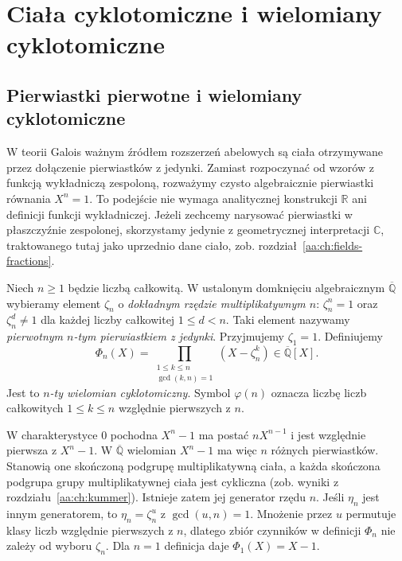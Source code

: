 \chapter{Ciała cyklotomiczne i wielomiany cyklotomiczne}
\label{aa:ch:cyclotomic}
\section{Pierwiastki pierwotne i wielomiany cyklotomiczne}

W teorii Galois ważnym źródłem rozszerzeń abelowych są ciała
otrzymywane przez dołączenie pierwiastków z jedynki.
Zamiast rozpoczynać od wzorów z funkcją wykładniczą zespoloną,
rozważymy czysto algebraicznie pierwiastki równania $X^n=1$.
To podejście nie wymaga analitycznej konstrukcji $\mathbb R$
ani definicji funkcji wykładniczej. Jeżeli zechcemy narysować
pierwiastki w płaszczyźnie zespolonej, skorzystamy jedynie
z geometrycznej interpretacji $\mathbb C$, traktowanego tutaj
jako uprzednio dane ciało, zob. rozdział~\ref{aa:ch:fields-fractions}.

\begin{definicja}\label{aa:def:cyclotomic}
Niech $n\ge1$ będzie liczbą całkowitą. W ustalonym domknięciu
algebraicznym $\overline{\mathbb Q}$ wybieramy element
$\zeta_n$ o \emph{dokładnym rzędzie multiplikatywnym $n$}:
$\zeta_n^n=1$ oraz $\zeta_n^d\ne1$ dla każdej liczby
całkowitej $1\le d<n$. Taki element nazywamy
\emph{pierwotnym $n$-tym pierwiastkiem z jedynki}.
Przyjmujemy $\zeta_1=1$. Definiujemy
\[
\Phi_n(X)=\prod_{\substack{1\le k\le n\\\gcd(k,n)=1}}
(X-\zeta_n^k)\in\overline{\mathbb Q}[X].
\]
Jest to \emph{$n$-ty wielomian cyklotomiczny}. Symbol
$\varphi(n)$ oznacza liczbę liczb całkowitych
$1\le k\le n$ względnie pierwszych z $n$.
\end{definicja}

\begin{uwaga}
W charakterystyce $0$ pochodna $X^n-1$ ma postać
$nX^{n-1}$ i jest względnie pierwsza z $X^n-1$.
W $\overline{\mathbb Q}$ wielomian $X^n-1$ ma więc
$n$ różnych pierwiastków. Stanowią one skończoną podgrupę
multiplikatywną ciała, a każda skończona podgrupa grupy
multiplikatywnej ciała jest cykliczna (zob. wyniki
z rozdziału~\ref{aa:ch:kummer}).
Istnieje zatem jej generator rzędu $n$.
Jeśli $\eta_n$ jest innym generatorem, to
$\eta_n=\zeta_n^u$ z $\gcd(u,n)=1$.
Mnożenie przez $u$ permutuje klasy liczb względnie
pierwszych z $n$, dlatego zbiór czynników w definicji
$\Phi_n$ nie zależy od wyboru $\zeta_n$.
Dla $n=1$ definicja daje $\Phi_1(X)=X-1$.
\end{uwaga}

